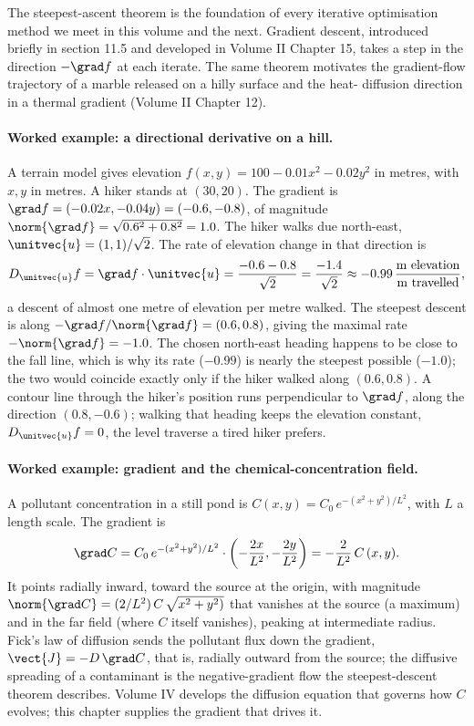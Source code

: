 The steepest-ascent theorem is the foundation of every iterative
optimisation method we meet in this volume and the next. Gradient
descent, introduced briefly in section 11.5 and developed in
Volume II Chapter 15, takes a step in the direction $-\grad f$ at
each iterate. The same theorem motivates the gradient-flow
trajectory of a marble released on a hilly surface and the heat-
diffusion direction in a thermal gradient (Volume II Chapter 12).

\paragraph{Worked example: a directional derivative on a hill.} A
terrain model gives elevation $f(x, y) = 100 - 0.01 x^{2} - 0.02
y^{2}$ in metres, with $x, y$ in metres. A hiker stands at $(30,
20)$. The gradient is $\grad f = (-0.02 x, -0.04 y) = (-0.6, -0.8)$,
of magnitude $\norm{\grad f} = \sqrt{0.6^{2} + 0.8^{2}} = 1.0$. The
hiker walks due north-east, $\unitvec{u} = (1, 1)/\sqrt{2}$. The
rate of elevation change in that direction is
\[
D_{\unitvec{u}} f = \grad f \cdot \unitvec{u} =
\frac{-0.6 - 0.8}{\sqrt{2}} = \frac{-1.4}{\sqrt{2}}
\approx -0.99\,\frac{\text{m elevation}}{\text{m travelled}},
\]
a descent of almost one metre of elevation per metre walked. The
steepest descent is along $-\grad f / \norm{\grad f} = (0.6, 0.8)$,
giving the maximal rate $-\norm{\grad f} = -1.0$. The chosen
north-east heading happens to be close to the fall line, which is
why its rate ($-0.99$) is nearly the steepest possible ($-1.0$); the
two would coincide exactly only if the hiker walked along $(0.6,
0.8)$. A contour line through the hiker's position runs perpendicular
to $\grad f$, along the direction $(0.8, -0.6)$; walking that
heading keeps the elevation constant, $D_{\unitvec{u}} f = 0$, the
level traverse a tired hiker prefers.

\paragraph{Worked example: gradient and the chemical-concentration
field.} A pollutant concentration in a still pond is $C(x, y) =
C_{0}\,e^{-(x^{2} + y^{2})/L^{2}}$, with $L$ a length scale. The
gradient is
\[
\grad C = C_{0}\,e^{-(x^{2} + y^{2})/L^{2}}\cdot
\left(-\frac{2x}{L^{2}}, -\frac{2y}{L^{2}}\right)
= -\frac{2}{L^{2}}\,C\,(x, y).
\]
It points radially inward, toward the source at the origin, with
magnitude $\norm{\grad C} = (2/L^{2})\,C\,\sqrt{x^{2} + y^{2})}$ that
vanishes at the source (a maximum) and in the far field (where $C$
itself vanishes), peaking at intermediate radius. Fick's law of
diffusion sends the pollutant flux down the gradient, $\vect{J} =
-D\,\grad C$, that is, radially outward from the source; the
diffusive spreading of a contaminant is the negative-gradient flow
the steepest-descent theorem describes. Volume IV develops the
diffusion equation that governs how $C$ evolves; this chapter
supplies the gradient that drives it.

